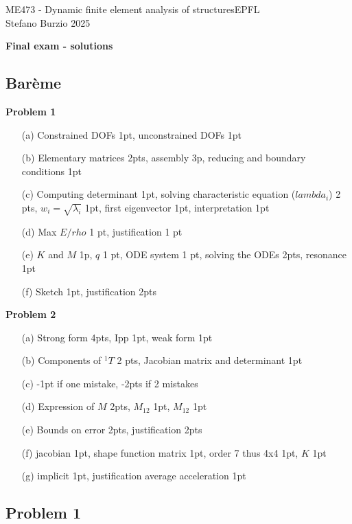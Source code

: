\documentclass[12pt]{article}
\begin{document}
\noindent ME473 - Dynamic finite element analysis of structures\hfill EPFL\\
Stefano Burzio \hfill 2025\\
\vspace{0.3cm}

\hspace*{\fill}\textbf{\Large Final exam - solutions}\hspace*{\fill}

\hrulefill



\subsection*{Barème}
\textbf{Problem 1}
\begin{itemize}
	\item[(a)] Constrained DOFs 1pt, unconstrained DOFs 1pt
	\item[(b)] Elementary matrices 2pts, assembly 3p, reducing and boundary conditions 1pt
	\item[(c)] Computing determinant 1pt, solving characteristic equation ($lambda_i$) 2 pts, $w_i=\sqrt{\lambda_i}$ 1pt, first eigenvector 1pt, interpretation 1pt
	\item[(d)] Max $E/rho$ 1 pt, justification 1 pt
	\item[(e)] $K$ and $M$ 1p, $q$ 1 pt, ODE system 1 pt, solving the ODEs 2pts, resonance 1pt
	\item[(f)] Sketch 1pt, justification 2pts
\end{itemize}
\textbf{Problem 2}
\begin{itemize}
	\item[(a)] Strong form 4pts, Ipp 1pt, weak form 1pt
	\item[(b)] Components of ${}^1T$ 2 pts, Jacobian matrix and determinant 1pt
	\item[(c)] -1pt if one mistake, -2pts if 2 mistakes
	\item[(d)] Expression of $M$ 2pts, $M_{12}$ 1pt, $M_{12}$ 1pt
	\item[(e)] Bounds on error 2pts, justification 2pts
	\item[(f)] jacobian 1pt, shape function matrix 1pt, order 7 thus 4x4 1pt, $K$ 1pt
	\item[(g)] implicit 1pt, justification average acceleration 1pt
\end{itemize}

\newpage
\subsection*{Problem 1}
\end{document}
